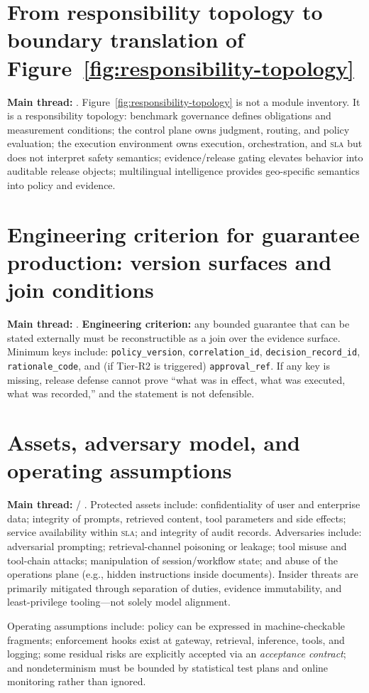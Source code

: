 \documentclass[11pt,a4paper]{report}
\begin{document}
\section{From responsibility topology to boundary translation of Figure~\ref{fig:responsibility-topology}}
\textbf{Main thread:} \ControlPlane{}. Figure~\ref{fig:responsibility-topology} is not a module inventory. It is a responsibility topology: benchmark governance defines obligations and measurement conditions; the control plane owns judgment, routing, and policy evaluation; the execution environment owns execution, orchestration, and \textsc{sla} but does not interpret safety semantics; evidence/release gating elevates behavior into auditable release objects; multilingual intelligence provides geo-specific semantics into policy and evidence.

\section{Engineering criterion for guarantee production: version surfaces and join conditions}
\textbf{Main thread:} \ControlPlane{}. \textbf{Engineering criterion:} any bounded guarantee that can be stated externally must be reconstructible as a join over the evidence surface. Minimum keys include: \texttt{policy\_version}, \texttt{correlation\_id}, \texttt{decision\_record\_id}, \texttt{rationale\_code}, and (if Tier-R2 is triggered) \texttt{approval\_ref}. If any key is missing, release defense cannot prove “what was in effect, what was executed, what was recorded,” and the statement is not defensible.

\section{Assets, adversary model, and operating assumptions}
\textbf{Main thread:} \ControlPlane{} / \EvalFramework{}. Protected assets include: confidentiality of user and enterprise data; integrity of prompts, retrieved content, tool parameters and side effects; service availability within \textsc{sla}; and integrity of audit records. Adversaries include: adversarial prompting; retrieval-channel poisoning or leakage; tool misuse and tool-chain attacks; manipulation of session/workflow state; and abuse of the operations plane (e.g., hidden instructions inside documents). Insider threats are primarily mitigated through separation of duties, evidence immutability, and least-privilege tooling—not solely model alignment.

Operating assumptions include: policy can be expressed in machine-checkable fragments; enforcement hooks exist at gateway, retrieval, inference, tools, and logging; some residual risks are explicitly accepted via an \emph{acceptance contract}; and nondeterminism must be bounded by statistical test plans and online monitoring rather than ignored.
\end{document}
